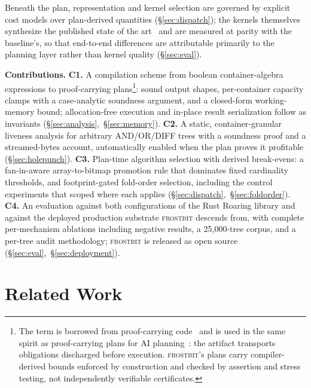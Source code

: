 \documentclass[sigconf,nonacm]{acmart}
\newcommand{\fb}{\textsc{frostbit}}
\begin{document}
Beneath the plan, representation and kernel selection are governed by
explicit cost models over plan-derived quantities
(\S\ref{sec:dispatch}); the kernels themselves synthesize the published
state of the art~\cite{schlegel2011,inoue2014,lemire2016simd,diez2021}
and are measured at parity with the baseline's, so that end-to-end
differences are attributable primarily to the planning layer rather
than kernel quality (\S\ref{sec:eval}).

\textbf{Contributions.}
\textbf{C1.} A compilation scheme from boolean container-algebra
expressions to proof-carrying plans\footnote{The term is borrowed from
proof-carrying code~\cite{necula1997} and is used in the same spirit as
proof-carrying plans for AI planning~\cite{schwaab2019}: the artifact
transports obligations discharged before execution. \fb's plans carry
compiler-derived bounds enforced by construction and checked by
assertion and stress testing, not independently verifiable
certificates.}: sound output shapes, per-container
capacity clamps with a case-analytic soundness argument, and a
closed-form working-memory bound; allocation-free execution and in-place
result serialization follow as invariants
(\S\ref{sec:analysis},~\S\ref{sec:memory}).
\textbf{C2.} A static, container-granular liveness analysis for arbitrary
AND/OR/DIFF trees with a soundness proof and a streamed-bytes account,
automatically enabled when the plan proves it profitable
(\S\ref{sec:holepunch}).
\textbf{C3.} Plan-time algorithm selection with derived break-evens: a
fan-in-aware array-to-bitmap promotion rule that dominates fixed
cardinality thresholds, and footprint-gated fold-order selection,
including the control experiments that scoped where each applies
(\S\ref{sec:dispatch},~\S\ref{sec:foldorder}).
\textbf{C4.} An evaluation against both configurations of the Rust
Roaring library and against the deployed production substrate \fb{}
descends from,
with complete per-mechanism ablations including negative results, a
25{,}000-tree corpus, and a per-tree audit methodology; \fb{} is
released as open source
(\S\ref{sec:eval},~\S\ref{sec:deployment}).

\section{Related Work}
\label{sec:related}
\end{document}
